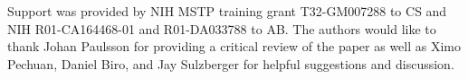Support was provided by NIH MSTP training grant T32-GM007288 to CS and NIH R01-CA164468-01 and R01-DA033788 to AB. The authors would like to thank Johan Paulsson for providing a critical review of the paper as well as Ximo Pechuan, Daniel Biro, and Jay Sulzberger for helpful suggestions and discussion.
